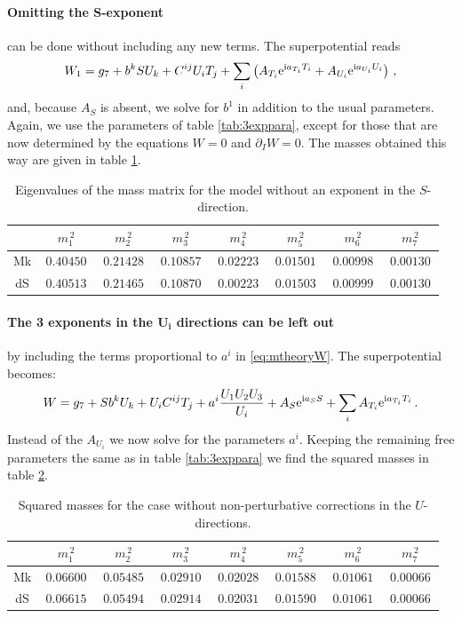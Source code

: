 \documentclass[a4paper,12pt,twoside,openright]{report}
\newcommand{\be}{\begin{equation}}
\newcommand{\ee}{\end{equation}}
\def\rmi{{\rm i}}
\def\rme{{\rm e}}
\begin{document}
\FloatBarrier
\paragraph{Omitting the $\mathbf{S}$-exponent} can be done without including any new terms. The superpotential reads
\be 
W_1 = g_7 + b^k S U_k + C^{ij} U_i T_j + \sum_i \left( A_{T_i} \rme^{\rmi a_{T_i}T_i} + A_{U_i} \rme^{\rmi a_{U_i}U_i} \right)\,,
\ee
and, because $A_S$ is absent, we solve for $b^1$ in addition to the usual parameters. Again, we use the parameters of table \ref{tab:3exppara}, except for those that are now determined by the equations $W = 0$ and $\partial_I W = 0$. The masses obtained this way are given in table \ref{tab:noSmass}.
\begin{table}[htb]
\center
\begin{tabular}{|c|c|c|c|c|c|c|c|}\hline
     &$\,m_1^{\,2}\,$&$\,m_2^{\,2}\,$&$\,m_3^{\,2}\,$&$\,m_4^{\,2}\,$&$\,m_5^{\,2}\,$&$\,m_6^{\,2}\,$&$\,m_7^{\,2}\,$\\\hline
Mk & $\, 0.40450 \,$ & $\, 0.21428 \,$ & $\, 0.10857 \,$ & $\, 0.02223 \,$ & $\, 0.01501 \,$ & $\, 0.00998 \,$ & $\, 0.00130 \,$ \\\hline  
dS & $\, 0.40513 \,$ & $\, 0.21465 \,$ & $\, 0.10870 \,$ & $\, 0.00223 \,$ & $\, 0.01503 \,$ & $\, 0.00999 \,$ & $\, 0.00130 \,$ \\\hline  
\end{tabular}
\caption{Eigenvalues of the mass matrix for the model without an exponent in the $S$-direction.}
\label{tab:noSmass}
\end{table}

\FloatBarrier
\paragraph{The 3 exponents in the $\mathbf{U_i}$ directions can be left out} by including the terms proportional to $a^i$ in \eqref{eq:mtheoryW}. The superpotential becomes:
\be
W = g_7 + S b^k U_k + U_i C^{ij} T_j + a^i \frac{U_1 U_2 U_3}{U_i} + A_S \rme^{\rmi a_S S} + \sum_i  A_{T_i} \rme^{\rmi a_{T_i}T_i}\,.
\ee
Instead of the $A_{U_i}$ we now solve for the parameters $a^i$. Keeping the remaining free parameters the same as in table \ref{tab:3exppara} we find the squared masses in table \ref{tab:noUmass}.
\begin{table}[htb]
\center
\begin{tabular}{|c|c|c|c|c|c|c|c|}\hline
     &$\,m_1^{\,2}\,$&$\,m_2^{\,2}\,$&$\,m_3^{\,2}\,$&$\,m_4^{\,2}\,$&$\,m_5^{\,2}\,$&$\,m_6^{\,2}\,$&$\,m_7^{\,2}\,$\\\hline
Mk & $\, 0.06600 \,$ & $\, 0.05485 \,$ & $\, 0.02910 \,$ & $\, 0.02028 \,$ & $\, 0.01588 \,$ & $\, 0.01061 \,$ & $\, 0.00066 \,$ \\\hline  
dS & $\, 0.06615 \,$ & $\, 0.05494 \,$ & $\, 0.02914 \,$ & $\, 0.02031 \,$ & $\, 0.01590 \,$ & $\, 0.01061 \,$ & $\, 0.00066 \,$  \\\hline  
\end{tabular}
\caption{Squared masses for the case without non-perturbative corrections in the $U$-directions.}
\label{tab:noUmass}
\end{table}
\end{document}
